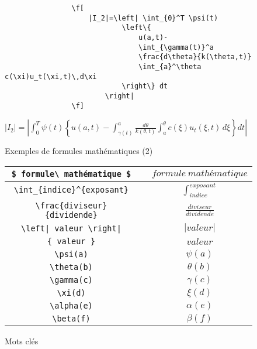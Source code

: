 		\begin{figure}[H]
			\begin{changemargin}{-2.5cm}{-2.5cm}
			\begin{tcolorbox}
			\begin{verbatim}
				\f[
				    |I_2|=\left| \int_{0}^T \psi(t) 
				            \left\{ 
				                u(a,t)-
				                \int_{\gamma(t)}^a 
				                \frac{d\theta}{k(\theta,t)}
				                \int_{a}^\theta c(\xi)u_t(\xi,t)\,d\xi
				            \right\} dt
				        \right|
				\f]
			\end{verbatim}
			\end{tcolorbox}
			\end{changemargin}

			\begin{changemargin}{-2.5cm}{-2.5cm}
			\begin{tcolorbox}
				$ |I_2|=\left| \int_{0}^T \psi(t) 
					\left\{ 
						u(a,t)-
						\int_{\gamma(t)}^a 
						\frac{d\theta}{k(\theta,t)}
						\int_{a}^\theta c(\xi)u_t(\xi,t)\,d\xi
					\right\} dt
				\right| $
			\end{tcolorbox}
			\end{changemargin}
			\caption{Exemples de formules mathématiques (2)}
		\end{figure}

		\begin{figure}[H]
			\begin{tabular*}{\textwidth}{| c@{\extracolsep{\fill} } l@{\extracolsep{\fill}->} c |}
				\hline
				\verb+$ formule\ mathématique $+ & & $ formule\ mathématique $ \\ \hline
				\verb+\int_{indice}^{exposant}+ & & $ \int_{indice}^{exposant} $ \\ \hline
				\verb+\frac{diviseur}{dividende}+ & & $ \frac{diviseur}{dividende} $ \\ \hline
				\verb+\left| valeur \right|+ & & $ \left| valeur \right| $ \\ \hline
				\verb+{ valeur }+ & & $ { valeur } $ \\ \hline
				\verb+\psi(a)+ & & $ \psi(a) $ \\ \hline
				\verb+\theta(b)+ & & $ \theta(b) $ \\ \hline
				\verb+\gamma(c)+ & & $ \gamma(c) $ \\ \hline
				\verb+\xi(d)+ & & $ \xi(d) $ \\ \hline
				\verb+\alpha(e)+ & & $ \alpha(e) $ \\ \hline
				\verb+\beta(f)+ & & $ \beta(f) $ \\ \hline
			\end{tabular*}
			\caption{Mots clés}
		\end{figure}

